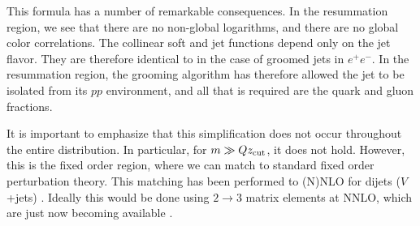 This formula has a number of remarkable consequences. In the resummation region, we see that there are no non-global logarithms, and there are no global color correlations. The collinear soft and jet functions depend only on the jet flavor. They are therefore identical to in the case of groomed jets in $e^+e^-$. In the resummation region, the grooming algorithm has therefore allowed the jet to be isolated from its $pp$ environment, and all that is required are the quark and gluon fractions. 


It is important to emphasize that this simplification does not occur
throughout the entire distribution. In particular, for $m \gg Qz_{\rm cut}$,
it does not hold. However, this is the fixed order region, where we
can match to standard fixed order perturbation theory. This matching
has been performed to (N)NLO for dijets ($V$+jets)
\cite{Frye:2016aiz,Marzani:2017kqd,Marzani:2017mva}.  Ideally this would be done using $2\to 3$ matrix
elements at NNLO, which are just now becoming available
\cite{Gehrmann:2015bfy,Dunbar:2016aux,Badger:2013yda,Badger:2017jhb,Abreu:2017hqn}.



%

%
%


